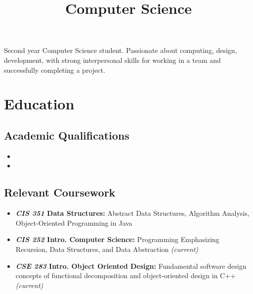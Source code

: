 \documentclass[11pt,a4paper,roman]{moderncv}        %
\title{Computer Science}                               %
\begin{document}
\makecvtitle

\small{Second year Computer Science student.  Passionate about computing, design, development, with strong interpersonal skills for working in a team and successfully completing a project.}

\section{Education}

\vspace{5pt}

\subsection{Academic Qualifications}

\vspace{5pt}

\begin{itemize}

\item{}

\item{}

\end{itemize}

\vspace{2pt}

\subsection{Relevant Coursework}

\vspace{5pt}

\begin{itemize}

  \item{\textbf{\textit{CIS 351} Data Structures:} Abstract Data Structures, Algorithm Analysis, Object-Oriented Programming in Java}
  \item{\textbf{\textit{CIS 252} Intro. Computer Science:} Programming Emphasizing Recursion, Data Structures, and Data Abstraction \textit{(current)}}
  \item{\textbf{\textit{CSE 283} Intro. Object Oriented Design:} Fundamental software design concepts of functional decomposition and object-oriented design in C++ \textit{(current)}}

\end{itemize}
\end{document}
